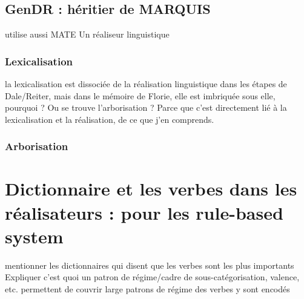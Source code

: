 \subsection{GenDR : héritier de MARQUIS}
utilise aussi MATE
Un réaliseur linguistique
\subsubsection{Lexicalisation}
la lexicalisation est dissociée de la réalisation linguistique dans les étapes de Dale/Reiter, mais dans le mémoire de Florie, elle est imbriquée sous elle, pourquoi ?
Ou se trouve l'arborisation ? Parce que c'est directement lié à la lexicalisation et la réalisation, de ce que j'en comprends.

\subsubsection{Arborisation}

\section{Dictionnaire et les verbes dans les réalisateurs : pour les rule-based system}
mentionner les dictionnaires qui disent que les verbes sont les plus importants
Expliquer c'est quoi un patron de régime/cadre de sous-catégorisation, valence, etc.
permettent de couvrir large
patrons de régime des verbes y sont encodés
